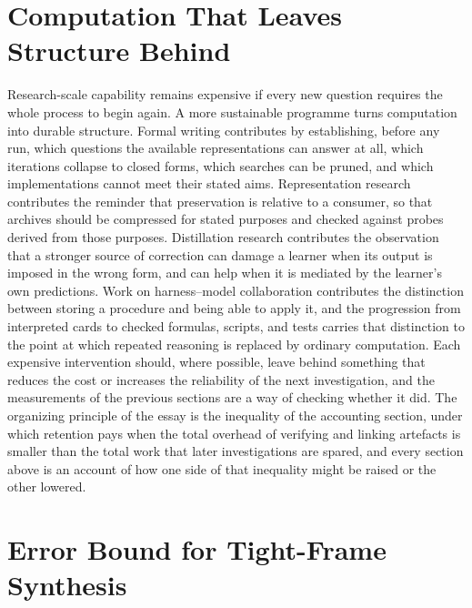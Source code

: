 \documentclass[11pt]{article}
\theoremstyle{remark}
\begin{document}
\section{Computation That Leaves Structure Behind}

Research-scale capability remains expensive if every new question requires the whole process to begin again. A more sustainable programme turns computation into durable structure. Formal writing contributes by establishing, before any run, which questions the available representations can answer at all, which iterations collapse to closed forms, which searches can be pruned, and which implementations cannot meet their stated aims. Representation research contributes the reminder that preservation is relative to a consumer, so that archives should be compressed for stated purposes and checked against probes derived from those purposes. Distillation research contributes the observation that a stronger source of correction can damage a learner when its output is imposed in the wrong form, and can help when it is mediated by the learner's own predictions. Work on harness--model collaboration contributes the distinction between storing a procedure and being able to apply it, and the progression from interpreted cards to checked formulas, scripts, and tests carries that distinction to the point at which repeated reasoning is replaced by ordinary computation. Each expensive intervention should, where possible, leave behind something that reduces the cost or increases the reliability of the next investigation, and the measurements of the previous sections are a way of checking whether it did. The organizing principle of the essay is the inequality of the accounting section, under which retention pays when the total overhead of verifying and linking artefacts is smaller than the total work that later investigations are spared, and every section above is an account of how one side of that inequality might be raised or the other lowered.

\appendix

\section{Error Bound for Tight-Frame Synthesis}
\end{document}
